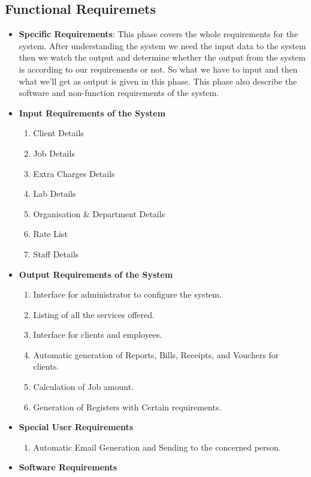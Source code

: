 \subsection{Functional Requiremets}
\begin{itemize}
\item {\bf Specific Requirements}: This phase covers the whole requirements 
for the system. After understanding the system we need the input data 
to the system then we watch the output and determine whether the output 
from the system is according to our requirements or not. So what we have 
to input and then what we’ll get as output is given in this phase. This 
phase also describe the software and non-function requirements of the 
system.
\item {\bf Input Requirements of the System}
\begin{enumerate} 
\item Client Details
\item Job Details
\item Extra Charges Details
\item Lab Details
\item Organisation \& Department Details
\item Rate List
\item Staff Details
\end{enumerate}
\vskip 0.5cm
\item {\bf Output Requirements of the System}
\begin{enumerate} 
\item Interface for administrator to configure the system.
\item Listing of all the services offered.
\item Interface for clients and employees.
\item Automatic generation of Reports, Bills, Receipts, and Vouchers 
for clients.
\item Calculation of Job amount.
\item Generation of Registers with Certain requirements.
\end{enumerate}
\vskip 0.5cm
\item {\bf Special User Requirements}
\begin{enumerate} 
\item Automatic Email Generation and Sending to the concerned person.
\end{enumerate}
\vskip 0.5cm
\item {\bf Software Requirements}
\begin{enumerate} 

\end{enumerate}
\end{itemize}
